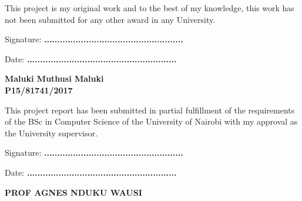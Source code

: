 \begin{flushleft}

    This project is my original work and to the best of my knowledge, this work has not been submitted for any other award in any University.

    \vspace{7em}

    Signature: \textbf{.....................................................} \\
    \vspace{2em}

    Date: \textbf{.........................................................} \\

    \vspace{2em}

    \textbf{Maluki Muthusi Maluki}\\
    \textbf{P15/81741/2017}

    \vspace{7em}

    This project report has been submitted in partial fulfillment of the requirements of the BSc in Computer Science of the University of Nairobi with my approval as the University supervisor.

    \vspace{7em}

    Signature: \textbf{.....................................................} \\
    \vspace{2em}

    Date: \textbf{.........................................................} \\

    \vspace{2em}

    \textbf{PROF AGNES NDUKU WAUSI}

\end{flushleft}
